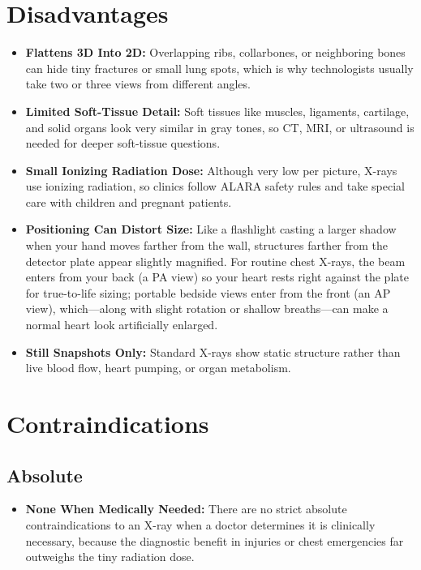 \section{Disadvantages}

\begin{itemize}
    \item \textbf{Flattens 3D Into 2D:} Overlapping ribs, collarbones, or neighboring bones can hide tiny fractures or small lung spots, which is why technologists usually take two or three views from different angles.
    \item \textbf{Limited Soft-Tissue Detail:} Soft tissues like muscles, ligaments, cartilage, and solid organs look very similar in gray tones, so CT, MRI, or ultrasound is needed for deeper soft-tissue questions.
    \item \textbf{Small Ionizing Radiation Dose:} Although very low per picture, X-rays use ionizing radiation, so clinics follow ALARA safety rules and take special care with children and pregnant patients.
    \item \textbf{Positioning Can Distort Size:} Like a flashlight casting a larger shadow when your hand moves farther from the wall, structures farther from the detector plate appear slightly magnified. For routine chest X-rays, the beam enters from your back (a PA view) so your heart rests right against the plate for true-to-life sizing; portable bedside views enter from the front (an AP view), which---along with slight rotation or shallow breaths---can make a normal heart look artificially enlarged.
    \item \textbf{Still Snapshots Only:} Standard X-rays show static structure rather than live blood flow, heart pumping, or organ metabolism.
\end{itemize}

\section{Contraindications}

\subsection{Absolute}

\begin{itemize}
    \item \textbf{None When Medically Needed:} There are no strict absolute contraindications to an X-ray when a doctor determines it is clinically necessary, because the diagnostic benefit in injuries or chest emergencies far outweighs the tiny radiation dose.
\end{itemize}

